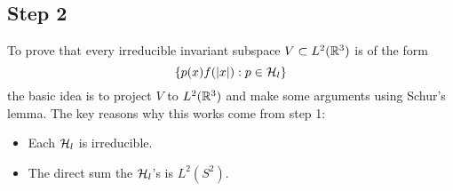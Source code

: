 \subsection{Step 2}
To prove that every irreducible invariant subspace $V \subset L^2({\mathbb R}^3)$ is of the form
\[
    \{p(x)f(|x|): p \in {\mathcal H}_l\}
\]
the basic idea is to project $V$ to $L^2({\mathbb R}^3)$ and make some arguments using Schur's lemma. The key reasons why this works come from step 1:
\begin{itemize}
    \item Each ${\mathcal H}_l$ is irreducible.
    \item The direct sum the ${\mathcal H}_l$'s is $L^2(S^2)$.
\end{itemize}
